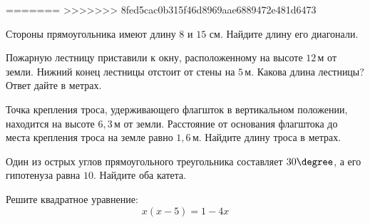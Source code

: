 =======
>>>>>>> 8fed5cac0b315f46d8969aae6889472e481d6473
\begin{homework}[number=1]
	\begin{listofex}
		\item Стороны прямоугольника имеют длину \( 8 \) и \( 15 \) см. Найдите длину его диагонали.
		\item Пожарную лестницу приставили к окну, расположенному на высоте \( 12 \) м от земли. Нижний конец лестницы отстоит от стены на \( 5 \) м. Какова длина лестницы? Ответ дайте в метрах.
		\item Точка крепления троса, удерживающего флагшток в вертикальном положении, находится на высоте \( 6,3 \) м от земли. Расстояние от основания флагштока до места крепления троса на земле равно \( 1,6 \) м. Найдите длину троса в метрах.
		\item Один из острых углов прямоугольного треугольника составляет \( 30\degree \), а его гипотенуза равна \( 10 \). Найдите оба катета.
		\item Решите квадратное уравнение:
		\[x(x-5)=1-4x\]
	\end{listofex}
\end{homework}

